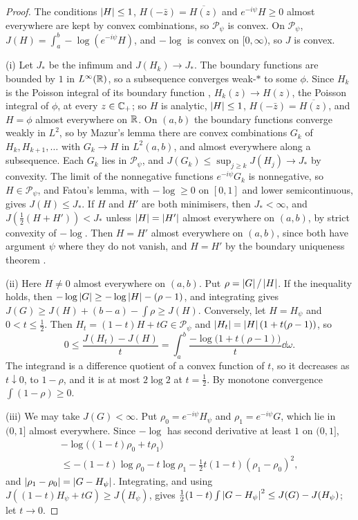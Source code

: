 \begin{proof}
The conditions $\left|H\right|\le1$, $H(-\bar z)=\overline{H(z)}$ and $e^{-i\psi}H\ge0$
almost everywhere are kept by convex combinations, so $\mathcal P_\psi$ is
convex. On $\mathcal P_\psi$, $J(H)=\int_a^b-\log(e^{-i\psi}H)$, and $-\log$ is
convex on $[0,\infty)$, so $J$ is convex.

(i) Let $J_*$ be the infimum and $J(H_k)\to J_*$. The boundary functions are
bounded by $1$ in $L^\infty(\mathbb R)$, so a subsequence converges weak-$*$ to some
$\phi$. Since $H_k$ is the Poisson integral of its boundary function
\cite[Ch.~I]{garnett}, $H_k(z)\to H(z)$, the Poisson integral of $\phi$, at
every $z\in\mathbb C_{+}$; so $H$ is analytic, $\left|H\right|\le1$, $H(-\bar z)=\overline{H(z)}$,
and $H=\phi$ almost everywhere on $\mathbb R$. On $(a,b)$ the boundary functions
converge weakly in $L^2$, so by Mazur's lemma there are convex combinations
$G_k$ of $H_k,H_{k+1},\dots$ with $G_k\to H$ in $L^2(a,b)$, and almost
everywhere along a subsequence. Each $G_k$ lies in $\mathcal P_\psi$, and
$J(G_k)\le\sup_{j\ge k}J(H_j)\to J_*$ by convexity. The limit of the
nonnegative functions $e^{-i\psi}G_k$ is nonnegative, so $H\in\mathcal P_\psi$,
and Fatou's lemma, with $-\log\ge0$ on $[0,1]$ and lower semicontinuous, gives
$J(H)\le J_*$. If $H$ and $H'$ are both minimisers, then $J_*<\infty$, and
$J(\frac12(H+H'))<J_*$ unless $\left|H\right|=\left|H'\right|$ almost everywhere on $(a,b)$,
by strict convexity of $-\log$. Then $H=H'$ almost everywhere on $(a,b)$, since
both have argument $\psi$ where they do not vanish, and $H=H'$ by the
boundary uniqueness theorem \cite[Ch.~II]{garnett}.

(ii) Here $H\ne0$ almost everywhere on $(a,b)$. Put $\rho=\left|G\right|/\left|H\right|$. If the
inequality holds, then $-\log\left|G\right|\ge-\log\left|H\right|-(\rho-1)$, and integrating
gives $J(G)\ge J(H)+(b-a)-\int\rho\ge J(H)$. Conversely, let $H=H_\psi$ and
$0<t\le\frac12$. Then $H_t=(1-t)H+tG\in\mathcal P_\psi$ and
$\left|H_t\right|=\left|H\right|(1+t(\rho-1))$, so
\[
0\le\frac{J(H_t)-J(H)}t=\int_a^b\frac{-\log\big(1+t(\rho-1)\big)}t\dd\omega .
\]
The integrand is a difference quotient of a convex function of $t$, so it
decreases as $t\downarrow0$, to $1-\rho$, and it is at most $2\log2$ at
$t=\frac12$. By monotone convergence $\int(1-\rho)\ge0$.

(iii) We may take $J(G)<\infty$. Put $\rho_0=e^{-i\psi}H_\psi$ and
$\rho_1=e^{-i\psi}G$, which lie in $(0,1]$ almost everywhere. Since $-\log$ has
second derivative at least $1$ on $(0,1]$,
\begin{multline*}
-\log\big((1-t)\rho_0+t\rho_1\big)\\
\le-(1-t)\log\rho_0-t\log\rho_1-\tfrac12t(1-t)(\rho_1-\rho_0)^2 ,
\end{multline*}
and $\left|\rho_1-\rho_0\right|=\left|G-H_\psi\right|$. Integrating, and using
$J((1-t)H_\psi+tG)\ge J(H_\psi)$, gives
$\frac12(1-t)\int\left|G-H_\psi\right|^2\le J(G)-J(H_\psi)$; let $t\to0$.


\end{proof}
